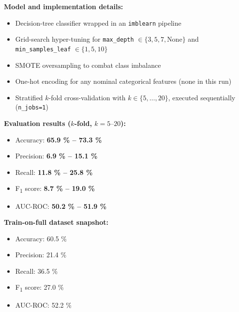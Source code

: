 \documentclass[11pt,a4paper]{article}
\begin{document}
\begin{tcolorbox}[%
        title=Decision Tree Classifier Implementation,
        colback=lightpurple!30,
        colframe=mediumpurple,
        boxrule=0.5pt,
        fonttitle=\bfseries\sffamily\footnotesize,
        fontupper=\footnotesize
    ]
    \textbf{Model and implementation details:}
    \begin{itemize}[leftmargin=*, itemsep=2pt, parsep=0pt]
        \item Decision-tree classifier wrapped in an \texttt{imblearn} pipeline
        \item Grid-search hyper-tuning for \verb|max_depth| $\in\{3,5,7,\text{None}\}$ and \verb|min_samples_leaf| $\in\{1,5,10\}$
        \item SMOTE oversampling to combat class imbalance
        \item One-hot encoding for any nominal categorical features (none in this run)
        \item Stratified $k$-fold cross-validation with $k\in\{5,\dots,20\}$, executed sequentially (\verb|n_jobs=1|)
    \end{itemize}

    \textbf{Evaluation results ($k$-fold, $k=5\text{–}20$):}
    \begin{itemize}[leftmargin=*, itemsep=2pt, parsep=0pt]
        \item Accuracy: \textbf{65.9 \% – 73.3 \%}
        \item Precision: \textbf{6.9 \% – 15.1 \%}
        \item Recall: \textbf{11.8 \% – 25.8 \%}
        \item F\textsubscript{1} score: \textbf{8.7 \% – 19.0 \%}
        \item AUC-ROC: \textbf{50.2 \% – 51.9 \%}
    \end{itemize}

    \textbf{Train-on-full dataset snapshot:}
    \begin{itemize}[leftmargin=*, itemsep=2pt, parsep=0pt]
        \item Accuracy: 60.5 \%
        \item Precision: 21.4 \%
        \item Recall: 36.5 \%
        \item F\textsubscript{1} score: 27.0 \%
        \item AUC-ROC: 52.2 \%
    \end{itemize}
\end{tcolorbox}
\end{document}
